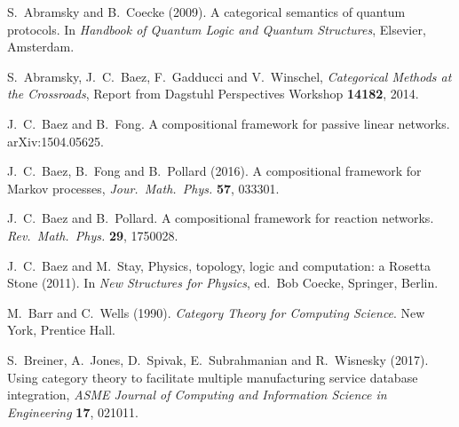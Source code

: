 \documentclass[12pt]{amsart}
\begin{document}
\begin{thebibliography}{99}

 S.\ Abramsky and B.\ Coecke (2009). A categorical
  semantics of quantum protocols. In \textsl{Handbook of Quantum Logic and Quantum Structures}, Elsevier, Amsterdam.  %

 S.\ Abramsky, J.\ C.\ Baez, F.\ Gadducci and V.\ Winschel, \textsl{Categorical Methods at the Crossroads}, Report from Dagstuhl Perspectives Workshop \textbf{14182}, 2014.  %

  J.\ C.\ Baez and B.\ Fong. A compositional framework for passive linear networks.  arXiv:1504.05625.

  J.\ C.\ Baez, B.\ Fong and B.\ Pollard
  (2016). A compositional framework for Markov processes,
  \textsl{Jour.\ Math.\ Phys.} \textbf{57}, 033301. %

 J.\ C.\ Baez and B.\ Pollard. A compositional
  framework for reaction networks. \textsl{Rev.\ Math.\ Phys.} \textbf{29}, 1750028.  %

  J.\ C.\ Baez and M.\ Stay, Physics, topology, logic
  and computation: a Rosetta Stone (2011). In \textsl{New Structures for Physics}, ed.\ Bob Coecke, Springer, Berlin.  %
  
 M.\ Barr and C.\ Wells (1990). \textsl{Category Theory for Computing Science}. 
New York, Prentice Hall.

 S.\ Breiner, A.\ Jones, D.\ Spivak, E.\
  Subrahmanian and R.\ Wisnesky (2017). Using category theory to facilitate multiple manufacturing service database integration, \textsl{ASME Journal of Computing and Information Science in Engineering} \textbf{17}, 021011.  %


\end{thebibliography}
\end{document}
